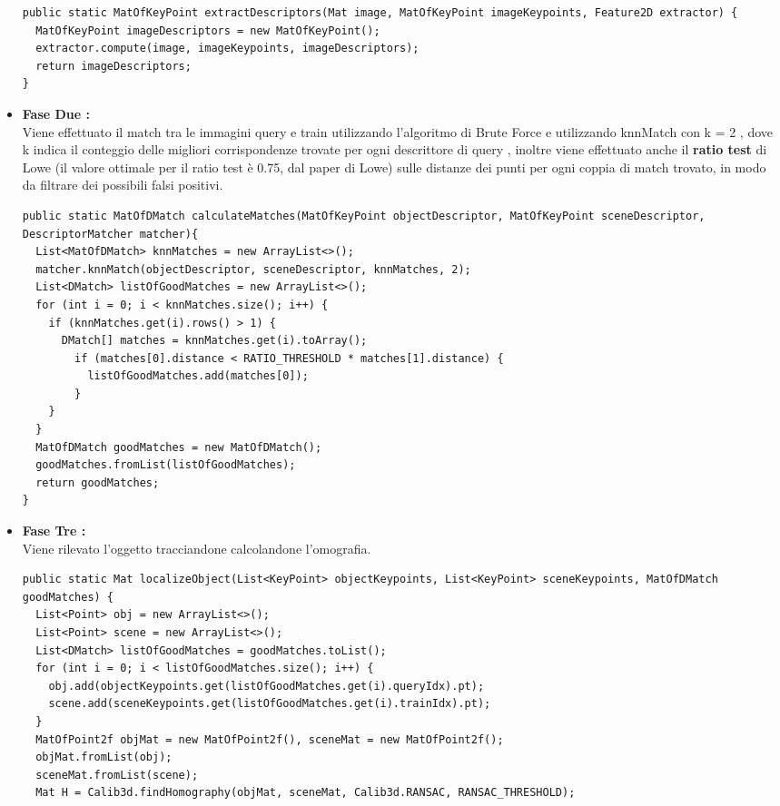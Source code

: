 \begin{itemize}
\begin{lstlisting}
public static MatOfKeyPoint extractDescriptors(Mat image, MatOfKeyPoint imageKeypoints, Feature2D extractor) {
  MatOfKeyPoint imageDescriptors = new MatOfKeyPoint();
  extractor.compute(image, imageKeypoints, imageDescriptors);
  return imageDescriptors;
}
\end{lstlisting}
	\item \textbf{Fase Due :}\\
	Viene effettuato il match tra le immagini query e train utilizzando l'algoritmo di Brute Force e utilizzando knnMatch con k = 2 , dove k indica il conteggio delle migliori corrispondenze trovate per ogni descrittore di query , inoltre viene effettuato anche il \textbf{ratio test} di Lowe (il valore ottimale per il ratio test è 0.75, dal paper di Lowe) sulle distanze dei punti per ogni coppia di match trovato, in modo da filtrare dei possibili falsi positivi.
\begin{lstlisting}
public static MatOfDMatch calculateMatches(MatOfKeyPoint objectDescriptor, MatOfKeyPoint sceneDescriptor, DescriptorMatcher matcher){
  List<MatOfDMatch> knnMatches = new ArrayList<>();
  matcher.knnMatch(objectDescriptor, sceneDescriptor, knnMatches, 2);
  List<DMatch> listOfGoodMatches = new ArrayList<>();
  for (int i = 0; i < knnMatches.size(); i++) {
    if (knnMatches.get(i).rows() > 1) {
      DMatch[] matches = knnMatches.get(i).toArray();
        if (matches[0].distance < RATIO_THRESHOLD * matches[1].distance) {
          listOfGoodMatches.add(matches[0]);
        }
    }
  }
  MatOfDMatch goodMatches = new MatOfDMatch();
  goodMatches.fromList(listOfGoodMatches);
  return goodMatches;
}
\end{lstlisting}
	\item \textbf{Fase Tre :}\\
	Viene rilevato l'oggetto tracciandone calcolandone l'omografia.
\begin{lstlisting}
public static Mat localizeObject(List<KeyPoint> objectKeypoints, List<KeyPoint> sceneKeypoints, MatOfDMatch goodMatches) {
  List<Point> obj = new ArrayList<>();
  List<Point> scene = new ArrayList<>();
  List<DMatch> listOfGoodMatches = goodMatches.toList();
  for (int i = 0; i < listOfGoodMatches.size(); i++) {
    obj.add(objectKeypoints.get(listOfGoodMatches.get(i).queryIdx).pt);
    scene.add(sceneKeypoints.get(listOfGoodMatches.get(i).trainIdx).pt);
  }
  MatOfPoint2f objMat = new MatOfPoint2f(), sceneMat = new MatOfPoint2f();
  objMat.fromList(obj);
  sceneMat.fromList(scene);
  Mat H = Calib3d.findHomography(objMat, sceneMat, Calib3d.RANSAC, RANSAC_THRESHOLD);

\end{lstlisting}
\end{itemize}
